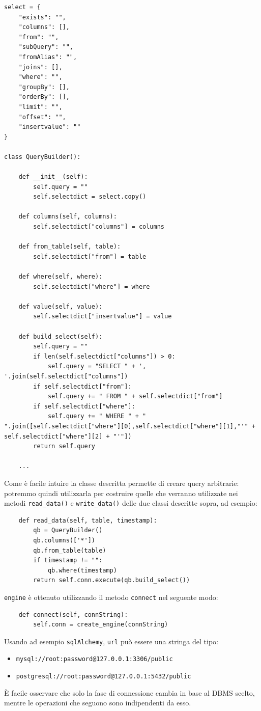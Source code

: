 \documentclass[a4paper]{article}
\begin{document}
\begin{lstlisting}
select = {
    "exists": "",
	"columns": [],
	"from": "",
	"subQuery": "",
	"fromAlias": "",
	"joins": [],
	"where": "",
	"groupBy": [],
	"orderBy": [],
	"limit": "",
	"offset": "",
    "insertvalue": ""
}

class QueryBuilder():

    def __init__(self):
        self.query = ""
        self.selectdict = select.copy()
    
    def columns(self, columns):
        self.selectdict["columns"] = columns
    
    def from_table(self, table):
        self.selectdict["from"] = table
    
    def where(self, where):
        self.selectdict["where"] = where
    
    def value(self, value):
        self.selectdict["insertvalue"] = value
        
    def build_select(self):
        self.query = ""
        if len(self.selectdict["columns"]) > 0:
            self.query = "SELECT " + ', '.join(self.selectdict["columns"])
        if self.selectdict["from"]:
            self.query += " FROM " + self.selectdict["from"]
        if self.selectdict["where"]:
            self.query += " WHERE " + " ".join([self.selectdict["where"][0],self.selectdict["where"][1],"'" + self.selectdict["where"][2] + "'"])
        return self.query
    
    ...
\end{lstlisting}
Come è facile intuire la classe descritta permette di creare query arbitrarie:
potremmo quindi utilizzarla per costruire quelle che verranno utilizzate nei
metodi \texttt{read\_data()} e \texttt{write\_data()} delle due classi
descritte sopra, ad esempio:
\begin{lstlisting}
    def read_data(self, table, timestamp):
        qb = QueryBuilder()
        qb.columns(['*'])
        qb.from_table(table)
        if timestamp != "":
            qb.where(timestamp)
        return self.conn.execute(qb.build_select())
\end{lstlisting}
\texttt{engine} è ottenuto utilizzando il metodo \texttt{connect} nel seguente
modo:
\begin{lstlisting}
    def connect(self, connString):
        self.conn = create_engine(connString)
\end{lstlisting}
Usando ad esempio \texttt{sqlAlchemy}, \texttt{url} può essere una stringa del
tipo:
\begin{itemize}
    \item \texttt{mysql://root:password@127.0.0.1:3306/public}
    \item \texttt{postgresql://root:password@127.0.0.1:5432/public}
\end{itemize}
È facile osservare che solo la fase di connessione cambia in base al DBMS
scelto, mentre le operazioni che seguono sono indipendenti da esso.
\end{document}
